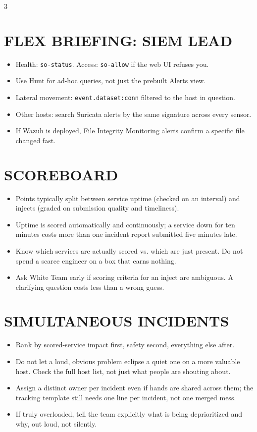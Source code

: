 \documentclass[7pt,landscape]{article}
\begin{document}
\begin{multicols*}{3}
\section{FLEX BRIEFING: SIEM LEAD}
\begin{itemize}
    \item Health: \texttt{so-status}. Access: \texttt{so-allow} if the web UI refuses you.
    \item Use Hunt for ad-hoc queries, not just the prebuilt Alerts view.
    \item Lateral movement: \texttt{event.dataset:conn} filtered to the host in question.
    \item Other hosts: search Suricata alerts by the same signature across every sensor.
    \item If Wazuh is deployed, File Integrity Monitoring alerts confirm a specific file changed fast.
\end{itemize}

\section{SCOREBOARD}
\begin{itemize}
    \item Points typically split between service uptime (checked on an interval) and injects (graded on submission quality and timeliness).
    \item Uptime is scored automatically and continuously; a service down for ten minutes costs more than one incident report submitted five minutes late.
    \item Know which services are actually scored vs. which are just present. Do not spend a scarce engineer on a box that earns nothing.
    \item Ask White Team early if scoring criteria for an inject are ambiguous. A clarifying question costs less than a wrong guess.
\end{itemize}

\section{SIMULTANEOUS INCIDENTS}
\begin{itemize}
    \item Rank by scored-service impact first, safety second, everything else after.
    \item Do not let a loud, obvious problem eclipse a quiet one on a more valuable host. Check the full host list, not just what people are shouting about.
    \item Assign a distinct owner per incident even if hands are shared across them; the tracking template still needs one line per incident, not one merged mess.
    \item If truly overloaded, tell the team explicitly what is being deprioritized and why, out loud, not silently.
\end{itemize}


\end{multicols*}
\end{document}
